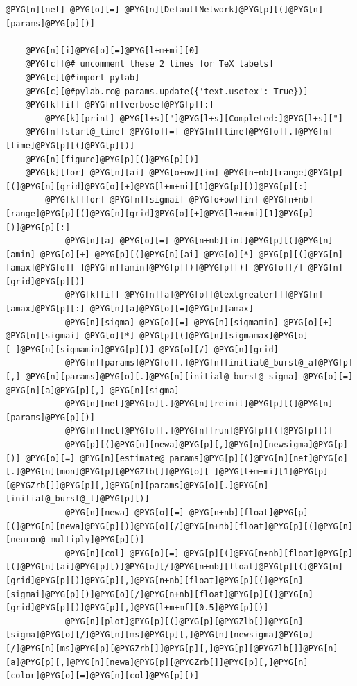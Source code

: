 \documentclass[letterpaper,10pt,english]{manual}
\begin{document}
\begin{Verbatim}[commandchars=@\[\]]
    @PYG[n][net] @PYG[o][=] @PYG[n][DefaultNetwork]@PYG[p][(]@PYG[n][params]@PYG[p][)]

    @PYG[n][i]@PYG[o][=]@PYG[l+m+mi][0]
    @PYG[c][@# uncomment these 2 lines for TeX labels]
    @PYG[c][@#import pylab]
    @PYG[c][@#pylab.rc@_params.update({'text.usetex': True})]
    @PYG[k][if] @PYG[n][verbose]@PYG[p][:]
        @PYG[k][print] @PYG[l+s]["]@PYG[l+s][Completed:]@PYG[l+s]["]
    @PYG[n][start@_time] @PYG[o][=] @PYG[n][time]@PYG[o][.]@PYG[n][time]@PYG[p][(]@PYG[p][)]
    @PYG[n][figure]@PYG[p][(]@PYG[p][)]
    @PYG[k][for] @PYG[n][ai] @PYG[o+ow][in] @PYG[n+nb][range]@PYG[p][(]@PYG[n][grid]@PYG[o][+]@PYG[l+m+mi][1]@PYG[p][)]@PYG[p][:]
        @PYG[k][for] @PYG[n][sigmai] @PYG[o+ow][in] @PYG[n+nb][range]@PYG[p][(]@PYG[n][grid]@PYG[o][+]@PYG[l+m+mi][1]@PYG[p][)]@PYG[p][:]
            @PYG[n][a] @PYG[o][=] @PYG[n+nb][int]@PYG[p][(]@PYG[n][amin] @PYG[o][+] @PYG[p][(]@PYG[n][ai] @PYG[o][*] @PYG[p][(]@PYG[n][amax]@PYG[o][-]@PYG[n][amin]@PYG[p][)]@PYG[p][)] @PYG[o][/] @PYG[n][grid]@PYG[p][)]
            @PYG[k][if] @PYG[n][a]@PYG[o][@textgreater[]]@PYG[n][amax]@PYG[p][:] @PYG[n][a]@PYG[o][=]@PYG[n][amax]
            @PYG[n][sigma] @PYG[o][=] @PYG[n][sigmamin] @PYG[o][+] @PYG[n][sigmai] @PYG[o][*] @PYG[p][(]@PYG[n][sigmamax]@PYG[o][-]@PYG[n][sigmamin]@PYG[p][)] @PYG[o][/] @PYG[n][grid]
            @PYG[n][params]@PYG[o][.]@PYG[n][initial@_burst@_a]@PYG[p][,] @PYG[n][params]@PYG[o][.]@PYG[n][initial@_burst@_sigma] @PYG[o][=] @PYG[n][a]@PYG[p][,] @PYG[n][sigma]
            @PYG[n][net]@PYG[o][.]@PYG[n][reinit]@PYG[p][(]@PYG[n][params]@PYG[p][)]
            @PYG[n][net]@PYG[o][.]@PYG[n][run]@PYG[p][(]@PYG[p][)]
            @PYG[p][(]@PYG[n][newa]@PYG[p][,]@PYG[n][newsigma]@PYG[p][)] @PYG[o][=] @PYG[n][estimate@_params]@PYG[p][(]@PYG[n][net]@PYG[o][.]@PYG[n][mon]@PYG[p][@PYGZlb[]]@PYG[o][-]@PYG[l+m+mi][1]@PYG[p][@PYGZrb[]]@PYG[p][,]@PYG[n][params]@PYG[o][.]@PYG[n][initial@_burst@_t]@PYG[p][)]
            @PYG[n][newa] @PYG[o][=] @PYG[n+nb][float]@PYG[p][(]@PYG[n][newa]@PYG[p][)]@PYG[o][/]@PYG[n+nb][float]@PYG[p][(]@PYG[n][neuron@_multiply]@PYG[p][)]
            @PYG[n][col] @PYG[o][=] @PYG[p][(]@PYG[n+nb][float]@PYG[p][(]@PYG[n][ai]@PYG[p][)]@PYG[o][/]@PYG[n+nb][float]@PYG[p][(]@PYG[n][grid]@PYG[p][)]@PYG[p][,]@PYG[n+nb][float]@PYG[p][(]@PYG[n][sigmai]@PYG[p][)]@PYG[o][/]@PYG[n+nb][float]@PYG[p][(]@PYG[n][grid]@PYG[p][)]@PYG[p][,]@PYG[l+m+mf][0.5]@PYG[p][)]
            @PYG[n][plot]@PYG[p][(]@PYG[p][@PYGZlb[]]@PYG[n][sigma]@PYG[o][/]@PYG[n][ms]@PYG[p][,]@PYG[n][newsigma]@PYG[o][/]@PYG[n][ms]@PYG[p][@PYGZrb[]]@PYG[p][,]@PYG[p][@PYGZlb[]]@PYG[n][a]@PYG[p][,]@PYG[n][newa]@PYG[p][@PYGZrb[]]@PYG[p][,]@PYG[n][color]@PYG[o][=]@PYG[n][col]@PYG[p][)]

\end{Verbatim}
\end{document}
